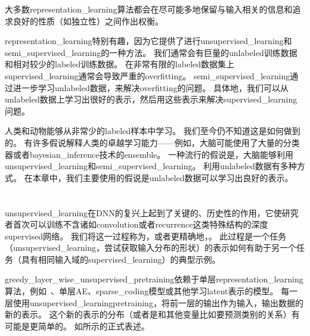 
大多数\gls{representation_learning}算法都会在尽可能多地保留与输入相关的信息和追求良好的性质（如独立性）之间作出权衡。


\gls{representation_learning}特别有趣，因为它提供了进行\gls{unsupervised_learning}和\gls{semi_supervised_learning}的一种方法。
我们通常会有巨量的\gls{unlabeled}训练数据和相对较少的\gls{labeled}训练数据。
在非常有限的\gls{labeled}数据集上\gls{supervised_learning}通常会导致严重的\gls{overfitting}。
\gls{semi_supervised_learning}通过进一步学习\gls{unlabeled}数据，来解决\gls{overfitting}的问题。
具体地，我们可以从\gls{unlabeled}数据上学习出很好的表示，然后用这些表示来解决\gls{supervised_learning}问题。


人类和动物能够从非常少的\gls{labeled}样本中学习。
我们至今仍不知道这是如何做到的。
有许多假说解释人类的卓越学习能力——例如，大脑可能使用了大量的分类器或者\gls{bayesian_inference}技术的\gls{ensemble}。
一种流行的假说是，大脑能够利用\gls{unsupervised_learning}和\gls{semi_supervised_learning}。
利用\gls{unlabeled}数据有多种方式。
在本章中，我们主要使用的假说是\gls{unlabeled}数据可以学习出良好的表示。



\section{}
\label{sec:greedy_layer_wise_unsupervised_pretraining}
\gls{unsupervised_learning}在\gls{DNN}的复兴上起到了关键的、历史性的作用，它使研究者首次可以训练不含诸如\gls{convolution}或者\gls{recurrence}这类特殊结构的深度\gls{supervised}网络。
我们将这一过程称为，或者更精确地，。
此过程是一个任务（\gls{unsupervised_learning}，尝试获取输入分布的形状）的表示如何有助于另一个任务（具有相同输入域的\gls{supervised_learning}）的典型示例。


\gls{greedy_layer_wise_unsupervised_pretraining}依赖于单层\gls{representation_learning}算法，例如~、单层\gls{AE}、\gls{sparse_coding}模型或其他学习\gls{latent}表示的模型。
每一层使用\gls{unsupervised_learning}\gls{pretraining}，将前一层的输出作为输入，输出数据的新的表示。
这个新的表示的分布（或者是和其他变量比如要预测类别的关系）有可能是更简单的。
如所示的正式表述。

